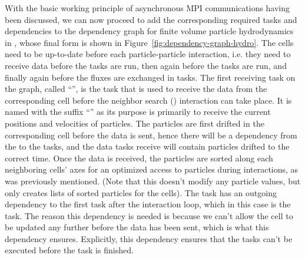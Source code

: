 With the basic working principle of asynchronous MPI communications having been discussed, we can
now proceed to add the corresponding required tasks and dependencies to the dependency graph for
finite volume particle hydrodynamics in \swift, whose final form is shown in
Figure~\ref{fig:dependency-graph-hydro}. The  cells need to be up-to-date before each
particle-particle interaction, i.e. they need to receive data before the  tasks are
run, then again before the  tasks are run, and finally again before the fluxes are
exchanged in  tasks. The first receiving task on the graph, called
``'', is the task that is used to receive the data from the corresponding
 cell before the neighbor search () interaction can take place. It is
named with the suffix ``'' as its purpose is primarily to receive the current positions
and velocities of particles. The particles are first drifted in the corresponding 
cell before the data is sent, hence there will be a dependency from the  to the
 tasks, and the data  tasks receive will contain particles drifted
to the correct time.  Once the data is received, the particles are sorted along each neighboring
cells' axes for an optimized access to particles during interactions, as was previously mentioned.
(Note that this doesn't modify any particle values, but only creates lists of sorted particles for
the cells). The  task has an outgoing dependency to the first task after the
interaction loop, which in this case is the  task. The reason this dependency is
needed is because we can't allow the cell to be updated any further before the data has been sent,
which is what this dependency ensures. Explicitly, this dependency ensures that the
 tasks can't be executed before the  task is finished.

